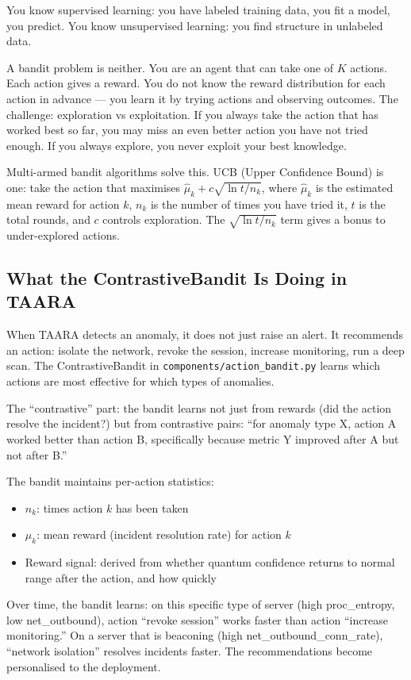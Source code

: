 \documentclass[11pt,a4paper]{article}
\begin{document}
You know supervised learning: you have labeled training data, you fit a model, you predict. You know unsupervised learning: you find structure in unlabeled data.

A bandit problem is neither. You are an agent that can take one of $K$ actions. Each action gives a reward. You do not know the reward distribution for each action in advance — you learn it by trying actions and observing outcomes. The challenge: exploration vs exploitation. If you always take the action that has worked best so far, you may miss an even better action you have not tried enough. If you always explore, you never exploit your best knowledge.

Multi-armed bandit algorithms solve this. UCB (Upper Confidence Bound) is one: take the action that maximises $\hat{\mu}_k + c\sqrt{\ln t / n_k}$, where $\hat{\mu}_k$ is the estimated mean reward for action $k$, $n_k$ is the number of times you have tried it, $t$ is the total rounds, and $c$ controls exploration. The $\sqrt{\ln t / n_k}$ term gives a bonus to under-explored actions.

\subsection{What the ContrastiveBandit Is Doing in TAARA}

When TAARA detects an anomaly, it does not just raise an alert. It recommends an action: isolate the network, revoke the session, increase monitoring, run a deep scan. The ContrastiveBandit in \texttt{components/action\_bandit.py} learns which actions are most effective for which types of anomalies.

The ``contrastive'' part: the bandit learns not just from rewards (did the action resolve the incident?) but from contrastive pairs: ``for anomaly type X, action A worked better than action B, specifically because metric Y improved after A but not after B.''

The bandit maintains per-action statistics:
\begin{itemize}
  \item $n_k$: times action $k$ has been taken
  \item $\mu_k$: mean reward (incident resolution rate) for action $k$
  \item Reward signal: derived from whether quantum confidence returns to normal range after the action, and how quickly
\end{itemize}

Over time, the bandit learns: on this specific type of server (high proc\_entropy, low net\_outbound), action ``revoke session'' works faster than action ``increase monitoring.'' On a server that is beaconing (high net\_outbound\_conn\_rate), ``network isolation'' resolves incidents faster. The recommendations become personalised to the deployment.
\end{document}
